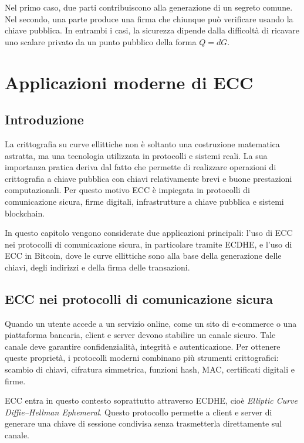 \documentclass[12pt,a4paper,oneside]{report}
\begin{document}
Nel primo caso, due parti contribuiscono alla generazione di un segreto comune. Nel secondo, una parte produce una firma che chiunque può verificare usando la chiave pubblica. In entrambi i casi, la sicurezza dipende dalla difficoltà di ricavare uno scalare privato da un punto pubblico della forma \(Q=dG\).

\chapter{Applicazioni moderne di ECC}

\section{Introduzione}

La crittografia su curve ellittiche non è soltanto una costruzione matematica astratta, ma una tecnologia utilizzata in protocolli e sistemi reali. La sua importanza pratica deriva dal fatto che permette di realizzare operazioni di crittografia a chiave pubblica con chiavi relativamente brevi e buone prestazioni computazionali. Per questo motivo ECC è impiegata in protocolli di comunicazione sicura, firme digitali, infrastrutture a chiave pubblica e sistemi blockchain.

In questo capitolo vengono considerate due applicazioni principali: l'uso di ECC nei protocolli di comunicazione sicura, in particolare tramite ECDHE, e l'uso di ECC in Bitcoin, dove le curve ellittiche sono alla base della generazione delle chiavi, degli indirizzi e della firma delle transazioni.

\section{ECC nei protocolli di comunicazione sicura}

Quando un utente accede a un servizio online, come un sito di e-commerce o una piattaforma bancaria, client e server devono stabilire un canale sicuro. Tale canale deve garantire confidenzialità, integrità e autenticazione. Per ottenere queste proprietà, i protocolli moderni combinano più strumenti crittografici: scambio di chiavi, cifratura simmetrica, funzioni hash, MAC, certificati digitali e firme.

ECC entra in questo contesto soprattutto attraverso ECDHE, cioè \textit{Elliptic Curve Diffie--Hellman Ephemeral}. Questo protocollo permette a client e server di generare una chiave di sessione condivisa senza trasmetterla direttamente sul canale.
\end{document}
